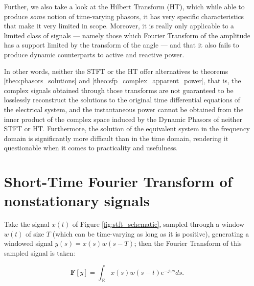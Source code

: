 	Further, we also take a look at the Hilbert Transform (HT), which while able to produce \textit{some} notion of time-varying phasors, it has very specific characteristics that make it very limited in scope. Moreover, it is really only applicable to a limited class of signals — namely those which Fourier Transform of the amplitude has a support limited by the transform of the angle — and that it also fails to produce dynamic counterparts to active and reactive power.

	In other words, neither the STFT or the HT offer alternatives to theorems \ref{theo:phasors_solutions} and \ref{theo:sfp_complex_apparent_power}, that is, the complex signals obtained through those transforms are not guaranteed to be losslessly reconstruct the solutions to the original time differential equations of the electrical system, and the instantaneous power cannot be obtained from the inner product of the complex space induced by the Dynamic Phasors of neither STFT or HT. Furthermore, the solution of the equivalent system in the frequency domain is significantly more difficult than in the time domain, rendering it questionable when it comes to practicality and usefulness.

\section{Short-Time Fourier Transform of nonstationary signals} %

	Take the signal $x(t)$ of Figure \ref{fig:stft_schematic}, sampled through a window $w(t)$ of size $T$ (which can be time-varying as long as it is positive), generating a windowed signal $y(s) = x(s)w(s-T)$; then the Fourier Transform of this sampled signal is taken:

\begin{equation} \mathbf{F}\left[y\right] = \int_{\ \mathbb{R}} x\left(s\right)w\left(s - t\right) e^{-j\omega s}ds . \label{eq:stft_generic}\end{equation}

